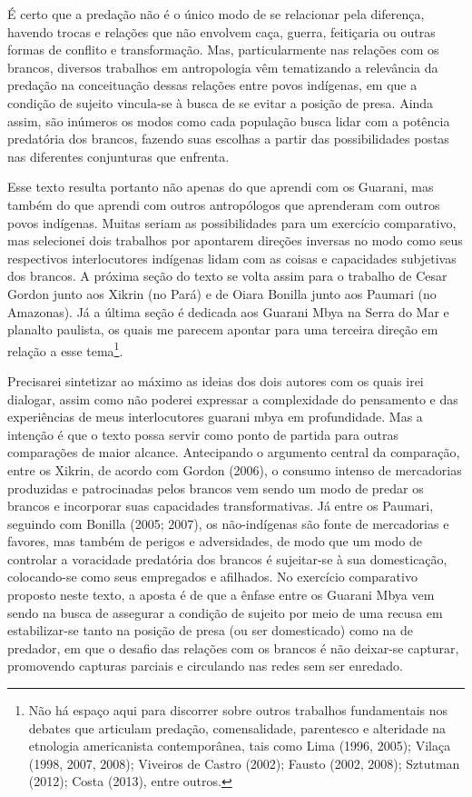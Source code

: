 \documentclass{article}
\begin{document}
\'E certo que a preda\c{c}\~ao n\~ao \'e o \'unico modo de se relacionar
pela diferen\c{c}a, havendo trocas e rela\c{c}\~oes que n\~ao envolvem
ca\c{c}a, guerra, feiti\c{c}aria ou outras formas de conflito e
transforma\c{c}\~ao. Mas, particularmente nas rela\c{c}\~oes com os
brancos, diversos trabalhos em antropologia v\^em tematizando a
relev\^ancia da preda\c{c}\~ao na conceitua\c{c}\~ao dessas
rela\c{c}\~oes entre povos ind\'igenas, em que a condi\c{c}\~ao de
sujeito vincula-se \`a busca de se evitar a posi\c{c}\~ao de presa.
Ainda assim, s\~ao in\'umeros os modos como cada popula\c{c}\~ao busca
lidar com a pot\^encia predat\'oria dos brancos, fazendo suas escolhas
a partir das possibilidades postas nas diferentes conjunturas que
enfrenta.

Esse texto resulta portanto n\~ao apenas do que aprendi com os Guarani,
mas tamb\'em do que aprendi com outros antrop\'ologos que aprenderam
com outros povos ind\'igenas. Muitas seriam as possibilidades para um
exerc\'icio comparativo, mas selecionei dois trabalhos por apontarem
dire\c{c}\~oes inversas no modo como seus respectivos interlocutores
ind\'igenas lidam com as coisas e capacidades subjetivas dos brancos. A
pr\'oxima se\c{c}\~ao do texto se volta assim para o trabalho de Cesar
Gordon junto aos Xikrin (no Par\'a) e de Oiara Bonilla junto aos
Paumari (no Amazonas). J\'a a \'ultima se\c{c}\~ao \'e dedicada aos
Guarani Mbya na Serra do Mar e planalto paulista, os quais me parecem
apontar para uma terceira dire\c{c}\~ao em rela\c{c}\~ao a esse
tema\footnote{ N\~ao h\'a espa\c{c}o aqui para discorrer sobre outros
trabalhos fundamentais nos debates que articulam preda\c{c}\~ao,
comensalidade, parentesco e alteridade na etnologia americanista
contempor\^anea, tais como Lima (1996, 2005); Vila\c{c}a (1998, 2007,
2008); Viveiros de Castro (2002); Fausto (2002, 2008); Sztutman (2012);
Costa (2013), entre outros.  }. 

Precisarei sintetizar ao m\'aximo as ideias dos dois autores com os
quais irei dialogar, assim como n\~ao poderei expressar a complexidade
do pensamento e das experi\^encias de meus interlocutores guarani mbya
em profundidade. Mas a inten\c{c}\~ao \'e que o texto possa servir como
ponto de partida para outras compara\c{c}\~oes de maior alcance.
Antecipando o argumento central da compara\c{c}\~ao, entre os Xikrin,
de acordo com Gordon (2006), o consumo intenso de mercadorias
produzidas e patrocinadas pelos brancos vem sendo um modo de predar os
brancos e incorporar suas capacidades transformativas. J\'a entre os
Paumari, seguindo com Bonilla (2005; 2007), os n\~ao-ind\'igenas s\~ao
fonte de mercadorias e favores, mas tamb\'em de perigos e adversidades,
de modo que um modo de controlar a voracidade predat\'oria dos brancos
\'e sujeitar-se \`a sua domestica\c{c}\~ao, colocando-se como seus
empregados e afilhados. No exerc\'icio comparativo proposto neste
texto, a aposta \'e de que a \^enfase entre os Guarani Mbya vem sendo
na busca de assegurar a condi\c{c}\~ao de sujeito por meio de uma
recusa em estabilizar-se tanto na posi\c{c}\~ao de presa (ou ser
domesticado) como na de predador, em que o desafio das rela\c{c}\~oes
com os brancos \'e n\~ao deixar-se capturar, promovendo capturas
parciais e circulando nas redes sem ser enredado. 
\end{document}
